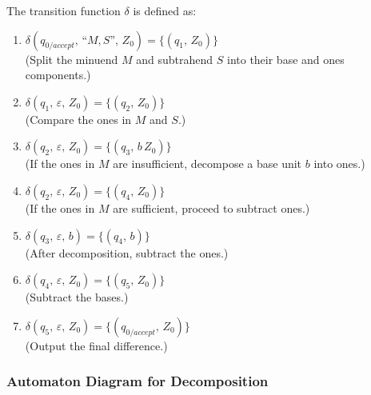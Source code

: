 \documentclass[11pt]{article}
\begin{document}
The transition function \(\delta\) is defined as:
\begin{enumerate}
    \item \(\delta(q_{0/accept},\, \text{``}M,S\text{''},\, Z_0) = \{(q_1,\, Z_0)\}\) \\
          (Split the minuend \(M\) and subtrahend \(S\) into their base and ones components.)
    \item \(\delta(q_1,\, \varepsilon,\, Z_0) = \{(q_2,\, Z_0)\}\) \\
          (Compare the ones in \(M\) and \(S\).)
    \item \(\delta(q_2,\, \varepsilon,\, Z_0) = \{(q_3,\, b\,Z_0)\}\) \\
          (If the ones in \(M\) are insufficient, decompose a base unit \(b\) into ones.)
    \item \(\delta(q_2,\, \varepsilon,\, Z_0) = \{(q_4,\, Z_0)\}\) \\
          (If the ones in \(M\) are sufficient, proceed to subtract ones.)
    \item \(\delta(q_3,\, \varepsilon,\, b) = \{(q_4,\, b)\}\) \\
          (After decomposition, subtract the ones.)
    \item \(\delta(q_4,\, \varepsilon,\, Z_0) = \{(q_5,\, Z_0)\}\) \\
          (Subtract the bases.)
    \item \(\delta(q_5,\, \varepsilon,\, Z_0) = \{(q_{0/accept},\, Z_0)\}\) \\
          (Output the final difference.)
\end{enumerate}

\subsubsection*{Automaton Diagram for Decomposition}
\end{document}
